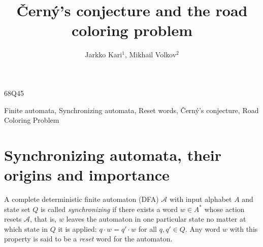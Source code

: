 \documentclass{irmaart}
\newcounter{hours}\newcounter{minutes}
\newcommand\printtime{\setcounter{hours}{\time/60}%
  \setcounter{minutes}{\time-\value{hours}*60}%
  \thehours\,h\,\theminutes}
\newcommand\dateandtime{\today\quad\printtime}
\begin{document}

\title{\v{C}ern\'{y}'s conjecture and the road coloring problem}
\author{Jarkko Kari$^1$,
  Mikhail Volkov$^2$}
\address{$^1$Department of Mathematics\\
FI-20014 University of Turku\\
Turku, Finland\\[2mm]
$^2$Department of Mathematics and Mechanics\\
620083 Ural State University\\
Ekaterinburg, Russia\\
email:\,\url{jkari@utu.fi,Mikhail.Volkov@usu.ru}\\[4mm]
\upshape{\dateandtime}}

\maketitle\label{chapterKV}

\begin{classification}
  68Q45
\end{classification}

\begin{keywords}
  Finite automata, Synchronizing automata, Reset words, \v{C}ern\'{y}'s conjecture,
  Road Coloring Problem
\end{keywords}



%
\localtableofcontents

\section{Synchronizing automata, their origins and importance}
A complete deterministic finite automaton (DFA) $\mathcal{A}$
with input alphabet $A$ and state set $Q$ is called
\emph{synchronizing} if there
exists a word $w\in A^*$ whose action resets $\mathcal{A}$, that
is, $w$ leaves the automaton in one particular state no matter
at which state in $Q$ it is applied: $q\cdot w=q'\cdot w$ for all
$q,q'\in Q$. Any word $w$ with this property is said to be a
\emph{reset} word for the automaton.
\end{document}

